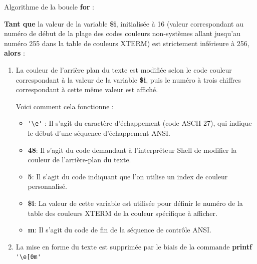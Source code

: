 \documentclass[a4paper,10pt]{article}
\begin{document}
    \begin{justify}
    	Algorithme de la boucle \textbf{\color{loop}for} :

    	\textbf{\color{loop}Tant que} la valeur de la variable \textbf{\color{vars}\$i}, initialisée à 16 (valeur correspondant au numéro de début de la plage des codes couleurs non-systèmes allant jusqu'au numéro 255 dans la table de couleurs XTERM) est strictement inférieure à 256, \textbf{\color{loop}alors} :

        \begin{enumerate}
    	    \item La couleur de l'arrière plan du texte est modifiée selon le code couleur correspondant à la valeur de la variable \textbf{\color{vars}\$i}, puis le numéro à trois chiffres correspondant à cette même valeur est affiché.

    	    \setlength{\parskip}{1em}

    	    Voici comment cela fonctionne :

    	    \begin{itemize}
                \setlength{\parskip}{1em}

    	        \item \verb+'\e'+ : Il s'agit du caractère d'échappement (code ASCII 27), qui indique le début d'une séquence d'échappement ANSI.

    	        \item \textbf{48}: Il s'agit du code demandant à l'interpréteur Shell de modifier la couleur de l'arrière-plan du texte.

    	        \item \textbf{5}: Il s'agit du code indiquant que l'on utilise un index de couleur personnalisé.

    	        \item \textbf{\color{vars}\${i}}: La valeur de cette variable est utilisée pour définir le numéro de la table des couleurs XTERM de la couleur spécifique à afficher.

    	        \item \textbf{m}: Il s'agit du code de fin de la séquence de contrôle ANSI.
            \end{itemize}

    	    \setlength{\parskip}{1em}

    	    \item La mise en forme du texte est supprimée par le biais de la commande \textbf{\color{cmds}printf} \verb|'\e[0m'|


\end{enumerate}
\end{justify}
\end{document}
